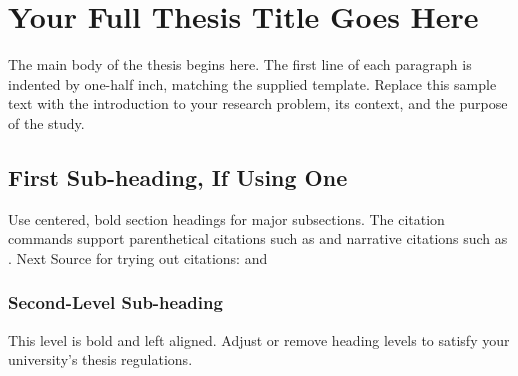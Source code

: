 \chapter{Your Full Thesis Title Goes Here}

The main body of the thesis begins here. The first line of each paragraph is
indented by one-half inch, matching the supplied template. Replace this sample
text with the introduction to your research problem, its context, and the
purpose of the study.

\section{First Sub-heading, If Using One}

Use centered, bold section headings for major subsections. The citation commands
support parenthetical citations such as \parencite{DBLP:journals/corr/abs-2007-03019}
and narrative citations such as \textcite{Danchev2022}.
Next Source for trying out citations: \cite{gomonov2019} and \cite{kang2013}

\subsection{Second-Level Sub-heading}

This level is bold and left aligned. Adjust or remove heading levels to satisfy
your university's thesis regulations.
